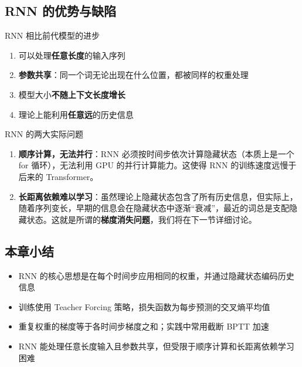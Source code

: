 \documentclass[a4paper]{article}
\begin{document}
\subsection{RNN 的优势与缺陷}

\begin{importantbox}{RNN 相比前代模型的进步}
\begin{enumerate}
    \item 可以处理\textbf{任意长度}的输入序列
    \item \textbf{参数共享}：同一个词无论出现在什么位置，都被同样的权重处理
    \item 模型大小\textbf{不随上下文长度增长}
    \item 理论上能利用\textbf{任意远}的历史信息
\end{enumerate}
\end{importantbox}

\begin{warningbox}{RNN 的两大实际问题}
\begin{enumerate}
    \item \textbf{顺序计算，无法并行}：RNN 必须按时间步依次计算隐藏状态（本质上是一个 for 循环），无法利用 GPU 的并行计算能力。这使得 RNN 的训练速度远慢于后来的 Transformer。
    \item \textbf{长距离依赖难以学习}：虽然理论上隐藏状态包含了所有历史信息，但实际上，随着序列变长，早期的信息会在隐藏状态中逐渐``衰减''，最近的词总是支配隐藏状态。这就是所谓的\textbf{梯度消失问题}，我们将在下一节详细讨论。
\end{enumerate}
\end{warningbox}

\subsection{本章小结}

\begin{itemize}
    \item RNN 的核心思想是在每个时间步应用相同的权重，并通过隐藏状态编码历史信息
    \item 训练使用 Teacher Forcing 策略，损失函数为每步预测的交叉熵平均值
    \item 重复权重的梯度等于各时间步梯度之和；实践中常用截断 BPTT 加速
    \item RNN 能处理任意长度输入且参数共享，但受限于顺序计算和长距离依赖学习困难
\end{itemize}

\end{document}
